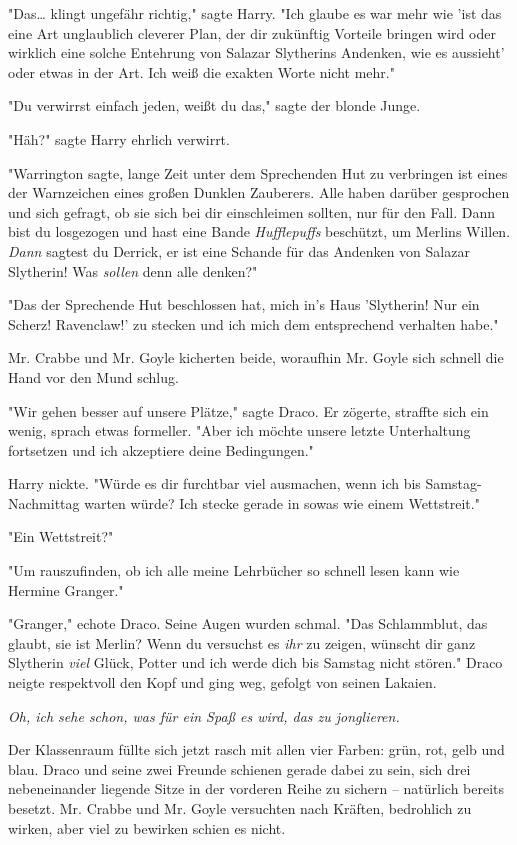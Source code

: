 {"Das… klingt ungefähr richtig," sagte Harry. "Ich glaube es war mehr wie 'ist das eine Art unglaublich cleverer Plan, der dir zukünftig Vorteile bringen wird oder wirklich eine solche Entehrung von Salazar Slytherins Andenken, wie es aussieht' oder etwas in der Art. Ich weiß die exakten Worte nicht mehr."

"Du verwirrst einfach jeden, weißt du das," sagte der blonde Junge.

"Häh?" sagte Harry ehrlich verwirrt.

"Warrington sagte, lange Zeit unter dem Sprechenden Hut zu verbringen ist eines der Warnzeichen eines großen Dunklen Zauberers. Alle haben darüber gesprochen und sich gefragt, ob sie sich bei dir einschleimen sollten, nur für den Fall. Dann bist du losgezogen und hast eine Bande \emph{Hufflepuffs} beschützt, um Merlins Willen. \emph{Dann} sagtest du Derrick, er ist eine Schande für das Andenken von Salazar Slytherin! Was \emph{sollen} denn alle denken?"

"Das der Sprechende Hut beschlossen hat, mich in's Haus 'Slytherin! Nur ein Scherz! Ravenclaw!' zu stecken und ich mich dem entsprechend verhalten habe."

Mr. Crabbe und Mr. Goyle kicherten beide, woraufhin Mr. Goyle sich schnell die Hand vor den Mund schlug.

"Wir gehen besser auf unsere Plätze," sagte Draco. Er zögerte, straffte sich ein wenig, sprach etwas formeller. "Aber ich möchte unsere letzte Unterhaltung fortsetzen und ich akzeptiere deine Bedingungen."

Harry nickte. "Würde es dir furchtbar viel ausmachen, wenn ich bis Samstag-Nachmittag warten würde? Ich stecke gerade in sowas wie einem Wettstreit."

"Ein Wettstreit?"

"Um rauszufinden, ob ich alle meine Lehrbücher so schnell lesen kann wie Hermine Granger."

"Granger," echote Draco. Seine Augen wurden schmal. "Das Schlammblut, das glaubt, sie ist Merlin? Wenn du versuchst es \emph{ihr} zu zeigen, wünscht dir ganz Slytherin \emph{viel} Glück, Potter und ich werde dich bis Samstag nicht stören." Draco neigte respektvoll den Kopf und ging weg, gefolgt von seinen Lakaien.

\emph{Oh, ich sehe schon, was für ein Spaß es wird, das zu jonglieren.}

Der Klassenraum füllte sich jetzt rasch mit allen vier Farben: grün, rot, gelb und blau. Draco und seine zwei Freunde schienen gerade dabei zu sein, sich drei nebeneinander liegende Sitze in der vorderen Reihe zu sichern -- natürlich bereits besetzt. Mr. Crabbe und Mr. Goyle versuchten nach Kräften, bedrohlich zu wirken, aber viel zu bewirken schien es nicht.

}
